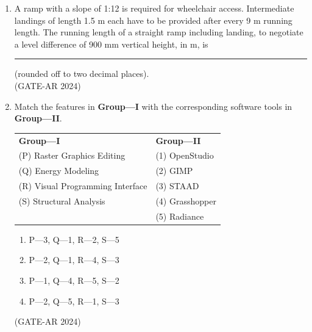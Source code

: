 \documentclass[a4paper,10pt]{article}
\begin{document}
\begin{enumerate}
    \item A ramp with a slope of 1:12 is required for wheelchair access. Intermediate landings of length 1.5 m each have to be provided after every 9 m running length. The running length of a straight ramp including landing, to negotiate a level difference of 900 mm vertical height, in m, is \rule{2cm}{0.4pt} (rounded off to two decimal places). \\
    \hfill (GATE-AR 2024)

    \item Match the features in \textbf{Group—I} with the corresponding software tools in \textbf{Group—II}. \\
    \begin{tabular}{ l l }
    \textbf{Group—I} & \textbf{Group—II} \\
    (P) Raster Graphics Editing & (1) OpenStudio \\
    (Q) Energy Modeling & (2) GIMP \\
    (R) Visual Programming Interface & (3) STAAD \\
    (S) Structural Analysis & (4) Grasshopper \\
    & (5) Radiance \\
    \end{tabular}
    \begin{multicols}{2}
    \begin{enumerate}
        \item P—3, Q—1, R—2, S—5
        \item P—2, Q—1, R—4, S—3
        \item P—1, Q—4, R—5, S—2
        \item P—2, Q—5, R—1, S—3
    \end{enumerate}
    \end{multicols}
    \hfill (GATE-AR 2024)


\end{enumerate}
\end{document}
